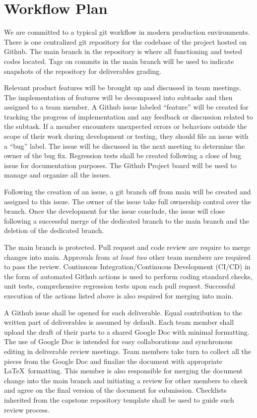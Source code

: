 \documentclass{article}
\begin{document}
\section{Workflow Plan}

We are committed to a typical git workflow in modern production environments.
There is one centralized git repository for the codebase of the project hosted
on Github. The main branch in the repository is where all functioning and tested
codes located. Tags on commits in the main branch will be used to indicate
snapshots of the repository for deliverables grading.

Relevant product features will be brought up and discussed in team meetings. The
implementation of features will be decomposed into subtasks and then assigned to
a team member. A Github issue labeled ``feature'' will be created for tracking
the progress of implementation and any feedback or discussion related to the
subtask. If a member encounters unexpected errors or behaviors outside the scope
of their work during development or testing, they should file an issue with a
``bug'' label. The issue will be discussed in the next meeting to determine the
owner of the bug fix. Regression tests shall be created following a close of bug
issue for documentation purposes. The Github Project board will be used to
manage and organize all the issues.

Following the creation of an issue, a git branch off from main will be created
and assigned to this issue. The owner of the issue take full ownership control
over the branch. Once the development for the issue conclude, the issue will
close following a successful merge of the dedicated branch to the main branch
and the deletion of the dedicated branch.

The main branch is protected. Pull request and code review are require to merge
changes into main. Approvals from \emph{at least two} other team members are
required to pass the review. Continuous Integration/Continuous Development
(CI/CD) in the form of automated Github actions is used to perform coding
standard checks, unit tests, comprehensive regression tests upon each pull
request. Successful execution of the actions listed above is also required for
merging into main.

A Github issue shall be opened for each deliverable. Equal contribution to the
written part of deliverables is assumed by default. Each team member shall
upload the draft of their parts to a shared Google Doc with minimal formatting.
The use of Google Doc is intended for easy collaborations and synchronous
editing in deliverable review meetings. Team members take turn to collect all
the pieces from the Google Doc and finalize the document with appropriate \LaTeX\
formatting. This member is also responsible for merging the document change into
the main branch and initiating a review for other members to check and agree on
the final version of the document for submission. Checklists inherited from the
capstone repository template shall be used to guide such review process.
\end{document}
